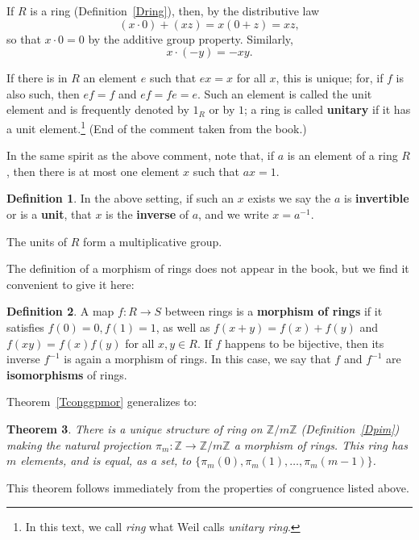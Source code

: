 \documentclass[12pt,letterpaper]{article}
\newcommand{\Z}{\mathbb{Z}}
\newcommand{\Zm}[1]{\Z/#1\Z}
\newtheorem{thm}{Theorem}%
\theoremstyle{definition}
\newtheorem{defn}[thm]{Definition}
\begin{document}
If $R$ is a ring (Definition~\ref{Dring}), then, by the distributive law 
$$
(x\cdot 0)+(xz)=x(0+z)=xz,
$$ 
so that $x\cdot 0=0$ by the additive group property. Similarly, 
$$
x\cdot(-y)=-xy.
$$ 

If there is in $R$ an element $e$ such that $ex=x$ for all $x$, this is unique; for, if $f$ is also such, then $ef=f$ and $ef=fe= e$. Such an element is called the unit element and is frequently denoted by $1_R$ or by $1$; a ring is called \textbf{unitary} if it has a unit element.\footnote{In this text, we call \emph{ring} what Weil calls \emph{unitary ring}.} (End of the comment taken from the book.) 

In the same spirit as the above comment, note that, if $a$ is an element of a ring $R$, then there is at most one element $x$ such that $ax=1$. 

\begin{defn}\label{Dunit}
In the above setting, if such an $x$ exists we say the $a$ is \textbf{invertible} or is a \textbf{unit},  that $x$ is the \textbf{inverse}  of $a$, and we write $x=a^{-1}$. 
\end{defn}

The units of $R$ form a multiplicative group. 

The definition of a morphism of rings does not appear in the book, but we find it convenient to give it here: 

\begin{defn}\label{Dringmor}
A map $f:R\to S$ between rings is a \textbf{morphism of rings}  if it satisfies $f(0)=0, f(1)=1$, as well as $f(x+y)=f(x)+f(y)$ and $f(xy)=f(x)f(y)$ for all $x,y\in R$. If $f$ happens to be bijective, then its inverse $f^{-1}$ is again a morphism of rings. In this case, we say that $f$ and $f^{-1}$ are \textbf{isomorphisms} of rings.  
\end{defn}

Theorem~\ref{Tconggpmor} generalizes to: 

\begin{thm}\label{Tcongringmor}
There is a unique structure of ring on $\Zm{m}$ (Definition~\ref{Dpim}) making the natural projection $\pi_m:\Z\to\Zm{m}$ a morphism of rings. This ring has $m$ elements, and is equal, as a set, to $\{\pi_m(0), \pi_m(1), \ldots, \pi_m(m-1)\}$.
\end{thm}

This theorem follows immediately from the properties of congruence listed above. 
\end{document}
